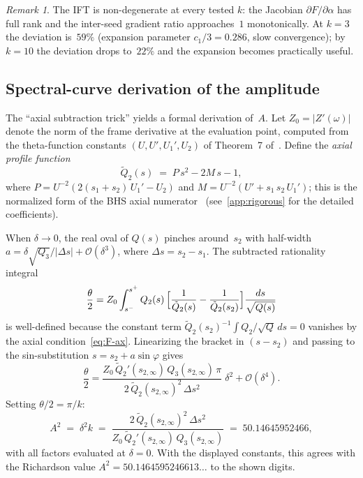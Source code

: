 \documentclass[11pt,a4paper]{article}
\theoremstyle{plain}
\theoremstyle{definition}
\theoremstyle{remark}
\newtheorem{remark}[theorem]{Remark}
\newcommand{\Oo}{\mathcal{O}}
\begin{document}
\begin{remark}
  The IFT is non-degenerate at every tested $k$: the Jacobian
  $\partial F/\partial\alpha$ has full rank and the inter-seed
  gradient ratio approaches~$1$ monotonically.  At $k=3$ the
  deviation is~$59\%$ (expansion parameter $c_1/3 = 0.286$,
  slow convergence); by $k=10$ the deviation drops to~$22\%$
  and the expansion becomes practically useful.
\end{remark}

\subsection{Spectral-curve derivation of the amplitude}%
\label{sec:spectral-remainder}

The ``axial subtraction trick'' yields a formal derivation of~$A$.
Let $Z_0 = \lvert Z'(\omega)\rvert$ denote the norm of the
frame derivative at the evaluation point, computed from the
theta-function constants $(U, U', U_1', U_2)$ of
Theorem~7 of~\cite{BHS25}.
Define the \emph{axial profile function}
\begin{equation}\label{eq:Qt2-def}
  \tilde Q_2(s) \;=\; P\,s^2 - 2M\,s - 1,
\end{equation}
where
$P = U^{-2}(2(s_1{+}s_2)\,U_1' - U_2)$ and
$M = U^{-2}(U' + s_1\,s_2\,U_1')$;
this is the normalized form of the BHS axial
numerator~\cite[Eq.~87]{BHS25}
(see~\cref{app:rigorous} for the detailed coefficients).

When $\delta \to 0$, the real oval of $Q(s)$ pinches around~$s_2$
with half-width $a = \delta\sqrt{Q_3}/\lvert\Delta s\rvert + \Oo(\delta^3)$,
where $\Delta s = s_2 - s_1$.  The subtracted rationality integral
\[
  \frac{\theta}{2}
  = Z_0 \int_{s^-}^{s^+} Q_2(s)\,
    \Bigl[\frac{1}{\tilde Q_2(s)} - \frac{1}{\tilde Q_2(s_2)}\Bigr]
    \frac{ds}{\sqrt{Q(s)}}
\]
is well-defined because the constant term
$\tilde Q_2(s_2)^{-1}\!\int Q_2/\sqrt{Q}\,ds = 0$
vanishes by the axial condition~\eqref{eq:F-ax}.
Linearizing the bracket in $(s - s_2)$ and passing to the
sin-substitution $s = s_2 + a\sin\varphi$ gives
\[
  \frac{\theta}{2}
  = \frac{Z_0\,\tilde Q_2'(s_{2,\infty})\,Q_3(s_{2,\infty})\,\pi}
         {2\,\tilde Q_2(s_{2,\infty})^2\,\Delta s^2}
    \;\delta^2 + \Oo(\delta^4).
\]
Setting $\theta/2 = \pi/k$:
\begin{equation}\label{eq:A2-formula}
  A^2 \;=\; \delta^2 k
  \;=\; \frac{2\,\tilde Q_2(s_{2,\infty})^2\,\Delta s^2}
             {Z_0\,\tilde Q_2'(s_{2,\infty})\,Q_3(s_{2,\infty})}
  \;=\; 50.14645952466,
\end{equation}
with all factors evaluated at $\delta = 0$.  With the displayed constants,
this agrees with the Richardson value
$A^2 = 50.1464595246613\ldots$ to the shown digits.
\end{document}
